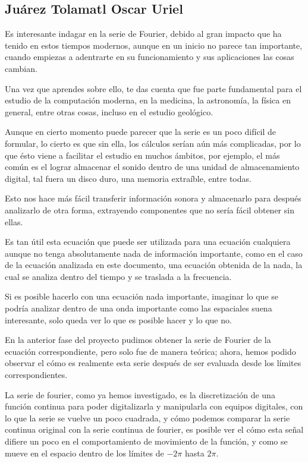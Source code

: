 \subsection{Juárez Tolamatl Oscar Uriel}

Es interesante indagar en la serie de Fourier, debido al gran impacto que ha tenido en estos tiempos modernos, aunque en un inicio no parece tan importante, cuando empiezas a adentrarte en su funcionamiento y sus aplicaciones las cosas cambian.

Una vez que aprendes sobre ello, te das cuenta que fue parte fundamental para el estudio de la computación moderna, en la medicina, la astronomía, la física en general, entre otras cosas, incluso en el estudio geológico.

Aunque en cierto momento puede parecer que la serie es un poco difícil de formular, lo cierto es que sin ella, los cálculos serían aún más complicadas, por lo que ésto viene a facilitar el estudio en muchos ámbitos, por ejemplo, el más común es el lograr almacenar el sonido dentro de una unidad de almacenamiento digital, tal fuera un disco duro, una memoria extraíble, entre todas.

Esto nos hace más fácil transferir información sonora y almacenarlo para después analizarlo de otra forma, extrayendo componentes que no sería fácil obtener sin ellas.

Es tan útil esta ecuación que puede ser utilizada para una ecuación cualquiera aunque no tenga absolutamente nada de información importante, como en el caso de la ecuación analizada en este documento, una ecuación obtenida de la nada, la cual se analiza dentro del tiempo y se traslada a la frecuencia.

Si es posible hacerlo con una ecuación nada importante, imaginar lo que se podría analizar dentro de una onda importante como las espaciales suena interesante, solo queda ver lo que es posible hacer y lo que no.

En la anterior fase del proyecto pudimos obtener la serie de Fourier de la ecuación correspondiente, pero solo fue de manera teórica; ahora, hemos podido observar el cómo es realmente esta serie después de ser evaluada desde los límites correspondientes.

La serie de fourier, como ya hemos investigado, es la discretización de una función continua para poder digitalizarla y manipularla con equipos digitales, con lo que la serie se vuelve un poco cuadrada, y cómo podemos comparar la serie continua original con la serie continua de fourier, es posible ver el cómo esta señal difiere un poco en el comportamiento de movimiento de la función, y como se mueve en el espacio dentro de los límites de \(-2 \pi\) hasta \(2 \pi\).

